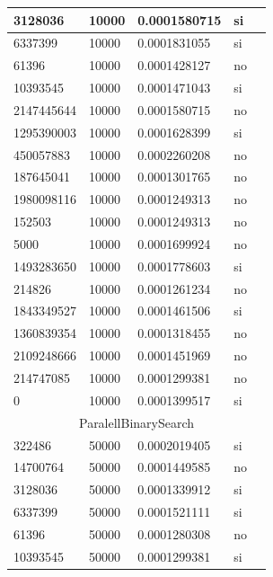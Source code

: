 \documentclass[12pt, fleqn]{article}                             %
\theoremstyle{break}                                            %
\begin{document}
\begin{longtable}{|m{5em}|m{5em}|m{10em}|m{5em}|@{}m{0pt}@{}}
            3128036& 10000  & 0.0001580715 & si &\\[1em]    \hline
            6337399& 10000  & 0.0001831055 & si &\\[1em]    \hline
            61396& 10000  & 0.0001428127 & no &\\[1em]    \hline
            10393545& 10000  & 0.0001471043 & si &\\[1em]    \hline
            2147445644& 10000  & 0.0001580715 & no &\\[1em]    \hline
            1295390003& 10000  & 0.0001628399 & si &\\[1em]    \hline
            450057883& 10000  & 0.0002260208 & no &\\[1em]    \hline
            187645041& 10000  & 0.0001301765 & no &\\[1em]    \hline
            1980098116& 10000  & 0.0001249313 & no &\\[1em]    \hline
            152503& 10000  & 0.0001249313 & no &\\[1em]    \hline
            5000& 10000  & 0.0001699924 & no &\\[1em]    \hline
            1493283650& 10000  & 0.0001778603 & si &\\[1em]    \hline
            214826& 10000  & 0.0001261234 & no &\\[1em]    \hline
            1843349527& 10000  & 0.0001461506 & si &\\[1em]    \hline
            1360839354& 10000  & 0.0001318455 & no &\\[1em]    \hline
            2109248666& 10000  & 0.0001451969 & no &\\[1em]    \hline
            214747085& 10000  & 0.0001299381 & no &\\[1em]    \hline
            0& 10000  & 0.0001399517 & si &\\[1em]    \hline
            \multicolumn{5}{|c|}{ParalellBinarySearch}   \\          \hline
            322486& 50000  & 0.0002019405 & si &\\[1em]    \hline
            14700764& 50000  & 0.0001449585 & no &\\[1em]    \hline
            3128036& 50000  & 0.0001339912 & si &\\[1em]    \hline
            6337399& 50000  & 0.0001521111 & si &\\[1em]    \hline
            61396& 50000  & 0.0001280308 & no &\\[1em]    \hline
            10393545& 50000  & 0.0001299381 & si &\\[1em]    \hline

\end{longtable}
\end{document}
